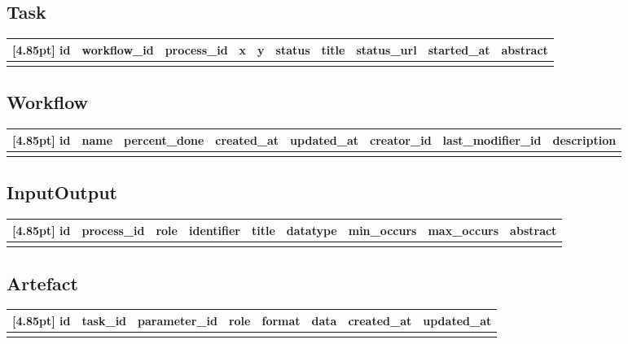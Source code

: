 		\subsection{Task}
		\begin{center}
			\setlength\tabcolsep{5pt}
			\renewcommand{\arraystretch}{1.5}
			\setcounter{ids}{0}			
			\begin{tabular}{|c|c|c|c|c|c|c|c|c|c|}
				\hline
				\rowcolor[gray]{0.75}[4.85pt]
				id & workflow\_id & process\_id & x & y & status & title & status\_url & started\_at & abstract \\ \hline
				&&&&&&&&& \\
				\hline
			\end{tabular}
		\end{center} 
		
		
		\subsection{Workflow}
		\begin{center}
			\setlength\tabcolsep{5pt}
			\renewcommand{\arraystretch}{1.5}
			\setcounter{ids}{0}			
			\begin{tabular}{|c|c|c|c|c|c|c|c|}
				\hline
				\rowcolor[gray]{0.75}[4.85pt]
				id & name & percent\_done & created\_at & updated\_at & creator\_id & last\_modifier_id & description \\ \hline 
				&&&&&&& \\
				\hline
			\end{tabular}
		\end{center}
		
		
		
		\subsection{InputOutput}
		\begin{center}
			\setlength\tabcolsep{5pt}
			\renewcommand{\arraystretch}{1.5}
			\setcounter{ids}{0}			
			\begin{tabular}{|c|c|c|c|c|c|c|c|c|}
				\hline
				\rowcolor[gray]{0.75}[4.85pt]
				id & process\_id & role & identifier & title & datatype & min\_occurs & max\_occurs & abstract \\ \hline 
				&&&&&&&& \\
				\hline
			\end{tabular}
		\end{center}
		
		
		\subsection{Artefact}
		\begin{center}
			\setlength\tabcolsep{5pt}
			\renewcommand{\arraystretch}{1.5}
			\setcounter{ids}{0}			
			\begin{tabular}{|c|c|c|c|c|c|c|c|}
				\hline
				\rowcolor[gray]{0.75}[4.85pt]
				id & task\_id & parameter\_id & role & format & data & created\_at & updated\_at \\ \hline 
				&&&&&&& \\
				\hline
			\end{tabular}
		\end{center}